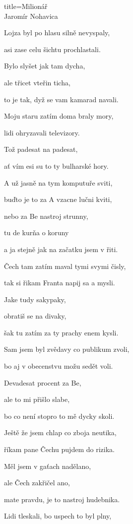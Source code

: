 \begin{song}{title=\centering Milionář \\\normalsize Jaromír Nohavica  \vspace*{-0.3cm}}
\begin{centerjustified}
\begin{minipage}[t]{0.48\textwidth}
\sloka
Lojza byl po hlasu silně nevyspaly, 

asi zase celu šichtu prochlastali.

Bylo slyšet jak tam dycha, 

ale třicet vteřin ticha, 

to je tak, dyž se vam kamarad navali.

\sloka
Moju staru zatím doma braly mory,

lidi ohryzavali televizory.



\end{minipage}\begin{minipage}[t]{0.5\textwidth}\setlength{\parindent}{\pindent}\vspace*{1.07cm}  %

Tož padesat na padesat, 

ať vím esi su to ty bulharské hory.

\sloka
A už jasně na tym komputuře sviti, 

buďto je to za A vzacne lučni kviti, 

nebo za Be nastroj strunny, 

tu de kurňa o koruny 

a ja stejně jak na začatku jsem v řiti.

\sloka
Čech tam zatím maval tymi svymi čisly,

tak si řikam Franta napij sa a mysli. 

Jake tudy sakypaky, 

obratiš se na divaky,

šak tu zatím za ty prachy enem kysli. 

\sloka
Sam jsem byl zvědavy co publikum zvoli, 

bo aj v obecenstvu možu sedět voli. 

Devadesat procent za Be, 

ale to mi přišlo slabe, 

bo co není stopro to mě dycky skoli. 

\sloka
Ještě že jsem chlap co zboja neutika, 

říkam pane Čechu pujdem do rizika. 

Měl jsem v gaťach nadělano, 

ale Čech zakřičel ano, 

mate pravdu, je to nastroj hudebnika.

\sloka 
Lidi tleskali, bo uspech to byl plny, 


\end{minipage}
\end{centerjustified}
\end{song}
